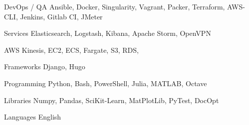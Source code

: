 

\begin{cvskills}

  \cvskill
    {DevOps / QA} %
    {Ansible, Docker, Singularity, Vagrant, Packer, Terraform, AWS-CLI, Jenkins, Gitlab CI, JMeter} %

  \cvskill
    {Services} %
    {Elasticsearch, Logstash, Kibana, Apache Storm, OpenVPN} %

  \cvskill
    {AWS} %
    {Kinesis, EC2, ECS, Fargate, S3, RDS, } %

  \cvskill
    {Frameworks} %
    {Django, Hugo} %

  \cvskill
    {Programming} %
    {Python, Bash, PowerShell, Julia, MATLAB, Octave} %

  \cvskill
    {Libraries} %
    {Numpy, Pandas, SciKit-Learn, MatPlotLib, PyTest, DocOpt} %

  \cvskill
    {Languages} %
    {English} %

\end{cvskills}
